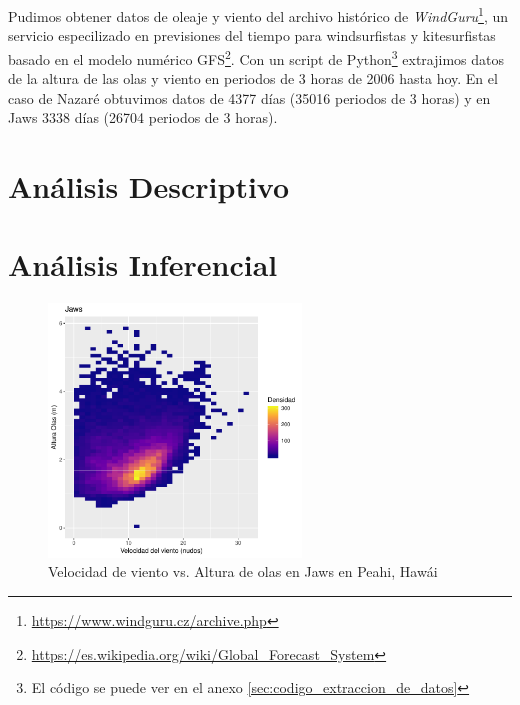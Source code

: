 Pudimos obtener datos de oleaje y viento del archivo histórico de \emph{WindGuru}\footnote{\url{https://www.windguru.cz/archive.php}}, un servicio especilizado en previsiones del tiempo para windsurfistas y kitesurfistas basado en el modelo numérico GFS\footnote{\url{https://es.wikipedia.org/wiki/Global_Forecast_System}}. Con un script de
Python\footnote{El código se puede ver en el anexo
  \ref{sec:codigo_extraccion_de_datos}} extrajimos datos de la altura de las
olas y viento en periodos de 3 horas de 2006 hasta hoy. En el caso de Nazaré
obtuvimos datos de 4377 días (35016 periodos de 3 horas) y en Jaws 3338 días
(26704 periodos de 3 horas).

\section{Análisis Descriptivo}%
\label{sec:metodos}

\section{Análisis Inferencial}%
\label{sec:resultados}



\begin{figure}[!ht]
\label{fig:wind_waves_jaws}
\centering
\includegraphics[width=0.6\textwidth]{./figures/jaws.pdf}
  \caption{Velocidad de viento vs. Altura de olas en Jaws en Peahi, Hawái}
\end{figure}

